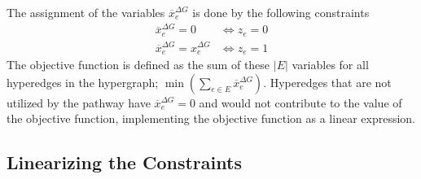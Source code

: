The assignment of the variables $\overline{x}^{\Delta G}_e$ is done by the following constraints
\begin{align}
    \overline{x}^{\Delta G}_e = 0 &\iff z_e = 0 \label{biimp1} \\
    \overline{x}^{\Delta G}_e = x^{\Delta G}_e &\iff z_e = 1 \label{biimp2}
\end{align}
The objective function is defined as the sum of these $|E|$ variables for all hyperedges in the hypergraph;
$\min\left(\sum_{e \in E} \overline{x}^{\Delta G}_e \right)$.
Hyperedges that are not utilized by the pathway have $\overline{x}^{\Delta G}_e = 0$ and would not contribute to the value of the objective function, implementing the objective function as a linear expression.


\subsection{Linearizing the Constraints}


